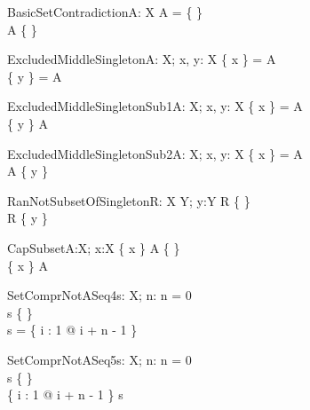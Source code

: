 \begin{theorem}{BasicSetContradiction}{A: \power X}
A = \{ \} \\
A \neq \{ \}
\end{theorem}

\begin{theorem}{ExcludedMiddleSingleton}{A: \power X; \const x, \const y: X}
\{ x \} = A \\
\{ y \} = A
\end{theorem}

\begin{theorem}{ExcludedMiddleSingletonSub1}{A: \power X; \const x, \const y: X}
\{ x \} = A \\
\{ y \} \subset A
\end{theorem}

\begin{theorem}{ExcludedMiddleSingletonSub2}{A: \power X; \const x, \const y: X}
\{ x \} = A \\
A  \subset \{ y \}
\end{theorem}

\begin{theorem}{RanNotSubsetOfSingleton}{R: X \rel Y; y:Y}
R \neq \{ \} \\
\ran R \subset \{ y \} 
\end{theorem}

\begin{theorem}{CapSubset}{A:\power X; x:X}
\{ x \} \cap A \neq \{ \} \\
\lnot \{ x \} \subseteq A
\end{theorem}



\begin{theorem}{SetComprNotASeq4}{s: \seq X; n: \nat}
n = 0 \\
s \neq \{ \} \\
\dom s  = \dom \{ i : 1 \upto \anything @ i + n - 1 \mapsto \anything \}
\end{theorem}

\begin{theorem}{SetComprNotASeq5}{s: \seq X; n: \nat}
n = 0 \\
s \neq \{ \} \\
\dom \{ i : 1 \upto \anything @ i + n - 1 \mapsto \anything \} \subset \dom s  
\end{theorem}

